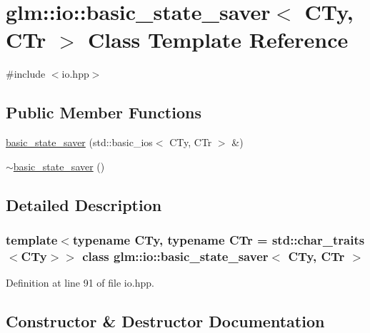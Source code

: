 \hypertarget{classglm_1_1io_1_1basic__state__saver}{}\section{glm\+:\+:io\+:\+:basic\+\_\+state\+\_\+saver$<$ C\+Ty, C\+Tr $>$ Class Template Reference}
\label{classglm_1_1io_1_1basic__state__saver}


{\ttfamily \#include $<$io.\+hpp$>$}

\subsection*{Public Member Functions}
\begin{DoxyCompactItemize}
\item 
\hyperlink{classglm_1_1io_1_1basic__state__saver_ab31652b0b7f2a24fa8f9fda2505de356}{basic\+\_\+state\+\_\+saver} (std\+::basic\+\_\+ios$<$ C\+Ty, C\+Tr $>$ \&)
\item 
\hyperlink{classglm_1_1io_1_1basic__state__saver_ad89569bbaec5d7fe08d40dbac5abbb53}{$\sim$basic\+\_\+state\+\_\+saver} ()
\end{DoxyCompactItemize}


\subsection{Detailed Description}
\subsubsection*{template$<$typename C\+Ty, typename C\+Tr = std\+::char\+\_\+traits$<$\+C\+Ty$>$$>$\newline
class glm\+::io\+::basic\+\_\+state\+\_\+saver$<$ C\+Ty, C\+Tr $>$}



Definition at line 91 of file io.\+hpp.



\subsection{Constructor \& Destructor Documentation}
\mbox{\label{classglm_1_1io_1_1basic__state__saver_ab31652b0b7f2a24fa8f9fda2505de356}} 

